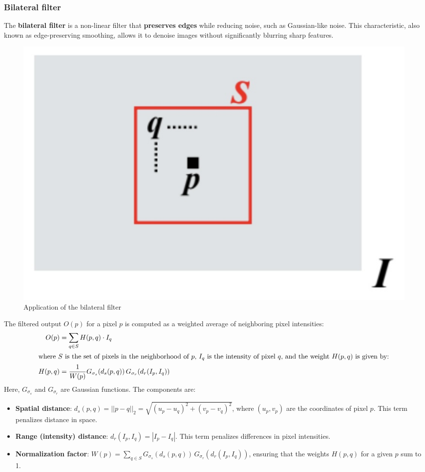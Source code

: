 \subsubsection{Bilateral filter}
The \textbf{bilateral filter} is a non-linear filter that \textbf{preserves edges} while reducing noise, such as Gaussian-like noise. This characteristic, also known as edge-preserving smoothing, allows it to denoise images without significantly blurring sharp features.

\begin{figure}[htbp]
  \centering
  \includegraphics[width=0.5\linewidth]{./img/bilateral_filter_application.jpg}
  \caption{Application of the bilateral filter}
  \label{fig:bilateral_filter_application}
\end{figure}

The filtered output $O(p)$ for a pixel $p$ is computed as a weighted average of neighboring pixel intensities:
\begin{align*}
O(p) &= \sum_{q \in S} H(p,q) \cdot I_q \\
\intertext{where $S$ is the set of pixels in the neighborhood of $p$, $I_q$ is the intensity of pixel $q$, and the weight $H(p,q)$ is given by:}
H(p,q) &= \frac{1}{W(p)} G_{\sigma_s}(d_s(p,q)) \, G_{\sigma_r}(d_r(I_p, I_q))
\end{align*}
Here, $G_{\sigma_s}$ and $G_{\sigma_r}$ are Gaussian functions. The components are:
\begin{itemize}
  \item \textbf{Spatial distance}: $d_s(p,q) = ||p-q||_2 = \sqrt{(u_p - u_q)^2 + (v_p - v_q)^2}$, where $(u_p, v_p)$ are the coordinates of pixel $p$. This term penalizes distance in space.
  \item \textbf{Range (intensity) distance}: $d_r(I_p, I_q) = |I_p - I_q|$. This term penalizes differences in pixel intensities.
  \item \textbf{Normalization factor}: $W(p) = \sum_{q \in S} G_{\sigma_s}(d_s(p,q)) \, G_{\sigma_r}(d_r(I_p, I_q))$, ensuring that the weights $H(p,q)$ for a given $p$ sum to 1.
\end{itemize}

